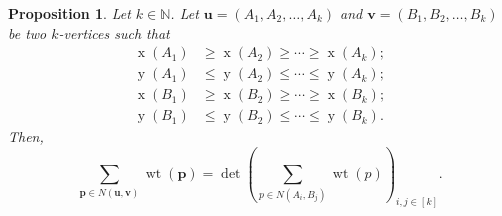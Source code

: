 \documentclass[reqno]{amsart}
\newcommand{\0}{\phantom{c}}
\DeclareMathOperator{\wt}{wt} %
\DeclareMathOperator{\xcoord}{x} %
\DeclareMathOperator{\ycoord}{y} %
\newcommand{\pp}{\mathbf{p}}
\newcommand{\uu}{\mathbf{u}}
\newcommand{\vv}{\mathbf{v}}
\newcommand{\NN}{\mathbb{N}}
\let\sumnonlimits\sum
\renewcommand{\sum}{\sumnonlimits\limits}
\newcommand{\tup}[1]{\left( #1 \right)}
\newcommand{\ive}[1]{\left[ #1 \right]}
\theoremstyle{plain}
\newtheorem{prop}[thm]{Proposition}
\theoremstyle{definition}
\numberwithin{equation}{section}
\begin{document}
\begin{prop}
\label{prop.LGV.concrete}
Let $k \in \NN$.
Let $\uu = \tup{A_1, A_2, \dotsc, A_k}$ and $\vv = \tup{B_1,B_2, \dotsc, B_k}$ be two $k$-vertices such that
\begin{align*}
\xcoord(A_1) & \geq \xcoord(A_2) \geq \cdots \geq \xcoord(A_k); \\
\ycoord(A_1) & \leq \ycoord(A_2) \leq \cdots \leq \ycoord(A_k); \\
\xcoord(B_1) & \geq \xcoord(B_2) \geq \cdots \geq \xcoord(B_k); \\
\ycoord(B_1) & \leq \ycoord(B_2) \leq \cdots \leq \ycoord(B_k).
\end{align*}
Then,
\[
\sum_{\pp \in N(\uu,\vv)} \wt(\pp) = \det\left(  \sum_{p\in N(A_i,B_j) } \wt(p) \right)_{i, j \in \ive{k}} .
\]

\end{prop}
\end{document}
